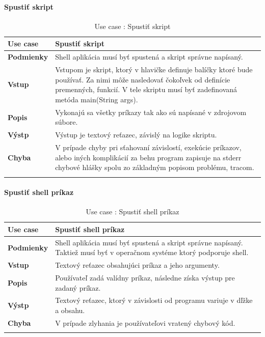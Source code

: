 \paragraph{Spustiť skript}
\begin{center}
	\begin{longtable}{|p{2.5cm}|p{14cm}|}
		\hline
		\textbf{Use case} & Spustiť skript \\ 
		\hline
		\textbf{Podmienky} & Shell aplikácia musí byť spustená a skript správne napísaný.\\ 
		\hline
		\textbf{Vstup} & Vstupom je skript, ktorý v hlavičke definuje balíčky ktoré bude používať. Za nimi môže nasledovať čokoľvek od definície premenných, funkcií. V tele skriptu musí byť zadefinovaná metóda main(String args).\\
		\hline
		\textbf{Popis} & Vykonajú sa všetky príkazy tak ako sú napísané v zdrojovom súbore. \\ 
		\hline
		\textbf{Výstp} & Výstup je textový reťazec, závislý na logike skriptu.\\
		\hline
		\textbf{Chyba} & V prípade chyby pri sťahovaní závislostí, exekúcie príkazov, alebo iných komplikácií za behu program zapisuje na stderr chybové hlášky spolu zo základným popisom problému, tracom.\\
		\hline
		\caption{Use case : Spustiť skript}
		\label{table:1}
	\end{longtable}

\end{center}

\paragraph{Spustiť shell príkaz}
\begin{center}
	\begin{longtable}{|p{2.5cm}|p{14cm}|}

			\hline
			\textbf{Use case} & Spustiť shell príkaz \\ 
			\hline
			\textbf{Podmienky} & Shell aplikácia musí byť spustená a skript správne napísaný. Taktiež musí byť v operačnom systéme ktorý podporuje shell. \\ 
			\hline
			\textbf{Vstup} & Textový reťazec obsahujúci príkaz a jeho argumenty.\\
			\hline
			\textbf{Popis} & Používateľ zadá valídny príkaz, následne získa výstup pre zadaný príkaz. \\ 
			\hline
			\textbf{Výstp} &Textový reťazec, ktorý v závislosti od programu variuje v dľžke a obsahu. \\
			\hline
			\textbf{Chyba} & V prípade zlyhania je používateľovi vratený chybový kód.\\
			\hline
		\caption{Use case : Spustiť shell príkaz}
	\label{table:1}
	
	\end{longtable}
\end{center}

